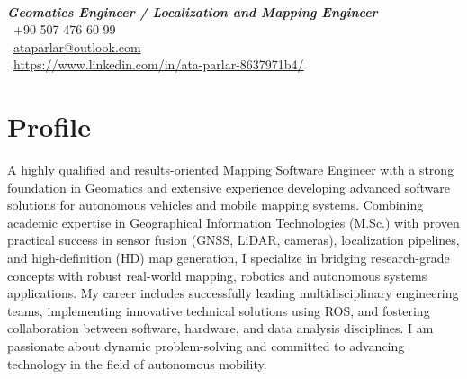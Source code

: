 \documentclass[10pt,a4paper]{article}
\begin{document}

 \\
\textit{\textbf{Geomatics Engineer / Localization and Mapping Engineer}} \\
{\color{contactblue} \faPhone} \ +90 507 476 60 99 \\
{\color{contactblue} \faEnvelope} \ \href{mailto:ataparlar@outlook.com}{ataparlar@outlook.com} \\
{\color{contactblue} \faLinkedin} \ \href{https://www.linkedin.com/in/ata-parlar-8637971b4/}{https://www.linkedin.com/in/ata-parlar-8637971b4/}

\vspace{-5pt}
\section{Profile}
\vspace{-5pt}
\noindent A highly qualified and results-oriented Mapping Software Engineer with a strong foundation in Geomatics and extensive experience developing advanced software solutions for autonomous vehicles and mobile mapping systems. Combining academic expertise in Geographical Information Technologies (M.Sc.) with proven practical success in sensor fusion (GNSS, LiDAR, cameras), localization pipelines, and high-definition (HD) map generation, I specialize in bridging research-grade concepts with robust real-world mapping, robotics and autonomous systems applications. My career includes successfully leading multidisciplinary engineering teams, implementing innovative technical solutions using ROS, and fostering collaboration between software, hardware, and data analysis disciplines. I am passionate about dynamic problem-solving and committed to advancing technology in the field of autonomous mobility.

\vspace{-5pt}

\end{document}
